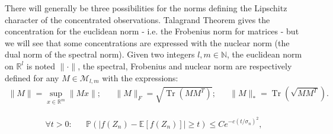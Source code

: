 \documentclass{ws-rmta}
\DeclareMathOperator{\tr}{Tr}
\begin{document}
There will generally be three possibilities for the norms defining the Lipschitz character of the concentrated observations. Talagrand Theorem gives the concentration for the euclidean norm - i.e. the Frobenius norm for matrices - but we will see that some concentrations are expressed with the nuclear norm (the dual norm of the spectral norm). Given two integers $l,m \in \mathbb N$, the euclidean norm on $\mathbb R^l$ is noted $\|\cdot\|$, the spectral, Frobenius and nuclear norm are respectively defined for any $M \in\mathcal M_{l,m}$ with the expressions:
\begin{align*}
  \|M\| = \sup_{x \in \mathbb R^m} \|Mx\|;&
  &\|M\|_F = \sqrt{\tr(MM^T)};&
  &\|M\|_* = \tr \left( \sqrt{MM^T}  \right).
\end{align*}
\begin{definition}\label{def:cnocentration_convexe}
     \begin{align*}
     \forall t>0:&
     &\mathbb P \left(\left\vert f(Z_n) - \mathbb E[f(Z_n)]\right\vert\geq t\right) \leq C e^{-c(t/\sigma_n)^2},
     \end{align*}

\end{definition}
\end{document}
